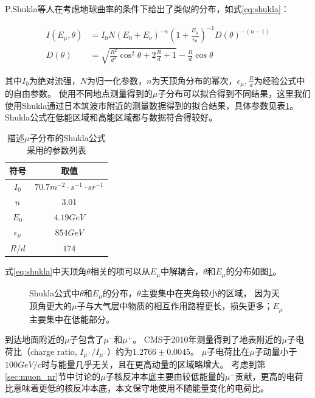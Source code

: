 P.Shukla等人在考虑地球曲率的条件下给出了类似的分布\cite{shukla_energy_2018}，如式\ref{eq:shukla}：

\begin{align}
    \label{eq:shukla}
    I\left(E_\mu,\theta\right) &= I_0 N\left(E_0+E_\nu\right)^{-n}\left(1 + \frac{E_\mu}{\epsilon_\mu}\right)^{-1}D(\theta)^{-(n-1)} \\
    D(\theta) &= \sqrt{\frac{R^2}{d^2}\cos^2\theta+2\frac{R}{d}+1}-\frac{R}{d}\cos\theta
\end{align}

其中$I_0$为绝对流强，$N$为归一化参数，$n$为天顶角分布的幂次，$\epsilon_\mu,\frac{R}{d}$为经验公式中的自由参数。
使用不同地点测量得到的$\mu$子分布可以拟合得到不同结果，这里我们使用Shukla通过日本筑波市附近的测量数据得到的拟合结果，具体参数见表\ref{tab:shukla}。
Shukla公式在低能区域和高能区域都与数据符合得较好。

\begin{table}
  \centering
  \caption{描述$\mu$子分布的Shukla公式采用的参数列表}
  \begin{tabular}{cc}
    \toprule
    符号 & 取值 \\
    \midrule
    $I_0$ & $70.7\si{m^{-2}\cdot s^{-1}\cdot sr^{-1}}$ \\
    $n$ & 3.01 \\
    $E_0$ & $4.19\si{GeV}$ \\
    $\epsilon_\mu$ & $854\si{GeV}$ \\
    $R/d$ & $174$ \\
    \bottomrule
  \end{tabular}
  \label{tab:shukla}
\end{table}

式\ref{eq:shukla}中天顶角$\theta$相关的项可以从$E_\mu$中解耦合，$\theta$和$E_\mu$的分布如图\ref{fig:shukla_distribution}。

\begin{figure}
    \centering
    
    \caption{\label{fig:shukla_distribution} Shukla公式中$\theta$和$E_\mu$的分布，$\theta$主要集中在夹角较小的区域，
    因为天顶角更大的$\mu$子与大气层中物质的相互作用路程更长，损失更多；$E_\mu$主要集中在低能部分。}
\end{figure}

到达地面附近的$\mu$子包含了$\mu^-$和$\mu^+$。
CMS于2010年测量得到了地表附近的$\mu$子电荷比（charge ratio, $I_{\mu^+}/I_{\mu^-}$）约为$1.2766\pm0.0045$\cite{the_cms_collaboration_measurement_2010}。
$\mu$子电荷比在$\mu$子动量小于$100\si{GeV/c}$时与能量几乎无关，且在更高动量的区域略增大。
考虑到第\ref{sec:muon_nr}节中讨论的$\mu$子核反冲本底主要由较低能量的$\mu^-$贡献，更高的电荷比意味着更低的核反冲本底，本文保守地使用不随能量变化的电荷比。


